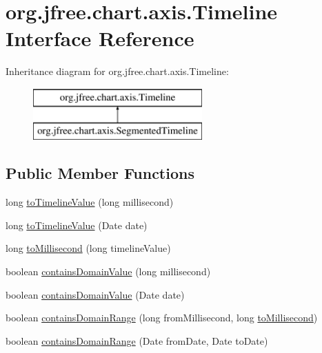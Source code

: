 \hypertarget{interfaceorg_1_1jfree_1_1chart_1_1axis_1_1_timeline}{}\section{org.\+jfree.\+chart.\+axis.\+Timeline Interface Reference}
\label{interfaceorg_1_1jfree_1_1chart_1_1axis_1_1_timeline}
Inheritance diagram for org.\+jfree.\+chart.\+axis.\+Timeline\+:\begin{figure}[H]
\begin{center}
\leavevmode
\includegraphics[height=2.000000cm]{interfaceorg_1_1jfree_1_1chart_1_1axis_1_1_timeline}
\end{center}
\end{figure}
\subsection*{Public Member Functions}
\begin{DoxyCompactItemize}
\item 
long \mbox{\hyperlink{interfaceorg_1_1jfree_1_1chart_1_1axis_1_1_timeline_a8723dcd01acdfba8854165da93d1d72a}{to\+Timeline\+Value}} (long millisecond)
\item 
long \mbox{\hyperlink{interfaceorg_1_1jfree_1_1chart_1_1axis_1_1_timeline_aadc67523764fdacdc35bd6aa816c87a7}{to\+Timeline\+Value}} (Date date)
\item 
long \mbox{\hyperlink{interfaceorg_1_1jfree_1_1chart_1_1axis_1_1_timeline_aa4bc34f354e4819d481369a12415a8c3}{to\+Millisecond}} (long timeline\+Value)
\item 
boolean \mbox{\hyperlink{interfaceorg_1_1jfree_1_1chart_1_1axis_1_1_timeline_a2c56414de5571774ff54ad8c10702a87}{contains\+Domain\+Value}} (long millisecond)
\item 
boolean \mbox{\hyperlink{interfaceorg_1_1jfree_1_1chart_1_1axis_1_1_timeline_a256e6d8899290d1f8a31f9d0c5ec69e7}{contains\+Domain\+Value}} (Date date)
\item 
boolean \mbox{\hyperlink{interfaceorg_1_1jfree_1_1chart_1_1axis_1_1_timeline_a36e80eb3f224df36ab4c3597ef17928f}{contains\+Domain\+Range}} (long from\+Millisecond, long \mbox{\hyperlink{interfaceorg_1_1jfree_1_1chart_1_1axis_1_1_timeline_aa4bc34f354e4819d481369a12415a8c3}{to\+Millisecond}})
\item 
boolean \mbox{\hyperlink{interfaceorg_1_1jfree_1_1chart_1_1axis_1_1_timeline_a9338cd3f5d7956c15d9716d4b1e4e5e8}{contains\+Domain\+Range}} (Date from\+Date, Date to\+Date)
\end{DoxyCompactItemize}


